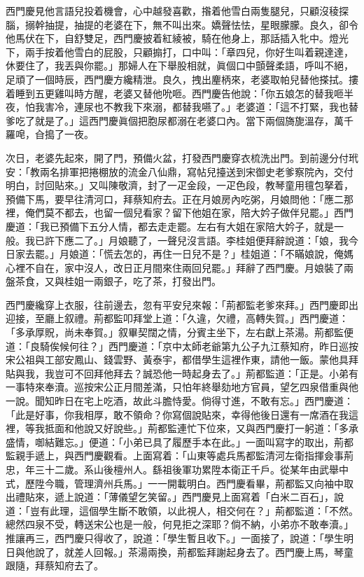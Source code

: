 西門慶見他言語兒投着機會，心中越發喜歡，揝着他雪白兩隻腿兒，{}只顧沒稜探腦，搦幹抽提，抽提的老婆在下，無不叫出來。嬌聲怯怯，星眼朦朦。良久，卻令他馬伏在下，自舒雙足，西門慶披着紅綾被，騎在他身上，那話插入牝中。燈光下，兩手按着他雪白的屁股，只顧搧打，口中叫：「章四兒，你好生叫着親達達，休要住了，我丟與你罷。」那婦人在下舉股相就，{}眞個口中顫聲柔語，呼叫不絕，足頑了一個時辰，西門慶方纔精泄。良久，拽出麈柄來，老婆取帕兒替他搽拭。摟着睡到五更雞叫時方醒，老婆又替他吮咂。西門慶告他說：「你五娘怎的替我咂半夜，怕我害冷，連尿也不教我下來溺，都替我嚥了。」{}老婆道：「這不打緊，我也替爹吃了就是了。」{}這西門慶眞個把胞尿都溺在老婆口內。{}當下兩個旖旎溫存，萬千羅唣，㒲搗了一夜。

次日，老婆先起來，開了門，預備火盆，打發西門慶穿衣梳洗出門。到前邊分付玳安：「教兩名排軍把捲棚放的流金八仙鼎，寫帖兒擡送到宋御史老爹察院內，交付明白，討回貼來。」又叫陳敬濟，封了一疋金段，一疋色段，教琴童用氊包拏着，預備下馬，要早往清河口，拜蔡知府去。正在月娘房內吃粥，月娘問他：「應二那裡，俺們莫不都去，也留一個兒看家？留下他姐在家，陪大妗子做伴兒罷。」西門慶道：「我已預備下五分人情，都去走走罷。左右有大姐在家陪大妗子，就是一般。我已許下應二了。」月娘聽了，一聲兒沒言語。李桂姐便拜辭說道：「娘，我今日家去罷。」月娘道：「慌去怎的，再住一日兒不是？」桂姐道：「不瞞娘說，俺媽心裡不自在，家中沒人，改日正月間來住兩回兒罷。」拜辭了西門慶。月娘裝了兩盤茶食，又與桂姐一兩銀子，吃了茶，打發出門。

西門慶纔穿上衣服，往前邊去，忽有平安兒來報：「荊都監老爹來拜。」西門慶即出迎接，至廳上叙禮。荊都監叩拜堂上道：「久違，欠禮，高轉失賀。」西門慶道：「多承厚貺，尚未奉賀。」叙畢契闊之情，分賓主坐下，左右獻上茶湯。荊都監便道：「良騎俟候何往？」西門慶道：「京中太師老爺第九公子九江蔡知府，昨日巡按宋公祖與工部安鳳山、錢雲野、黃泰宇，都借學生這裡作東，請他一飯。蒙他具拜貼與我，我豈可不回拜他拜去？誠恐他一時起身去了。」{}荊都監道：「正是。小弟有一事特來奉瀆。巡按宋公正月間差滿，只怕年終舉劾地方官員，望乞四泉借重與他一說。聞知昨日在宅上吃酒，故此斗膽恃愛。倘得寸進，不敢有忘。」西門慶道：「此是好事，你我相厚，敢不領命？你寫個說貼來，幸得他後日還有一席酒在我這裡，等我抵面和他說又好說些。」荊都監連忙下位來，又與西門慶打一躬道：「多承盛情，啣結難忘。」便道：「小弟已具了履歷手本在此。」一面叫寫字的取出，荊都監親手遞上，與西門慶觀看。上面寫着：「山東等處兵馬都監清河左衛指揮僉事荊忠，年三十二歲。系山後檀州人。繇祖後軍功累陞本衛正千戶。從某年由武舉中式，歷陞今職，管理濟州兵馬。」一一開載明白。西門慶看畢，荊都監又向袖中取出禮貼來，遞上說道：「薄儀望乞笑留。」{}西門慶見上面寫着「白米二百石」，說道：「豈有此理，這個學生斷不敢領，以此視人，相交何在？」荊都監道：「不然。總然四泉不受，轉送宋公也是一般，何見拒之深耶？倘不納，小弟亦不敢奉瀆。」推讓再三，西門慶只得收了，說道：「學生暫且收下。」一面接了，說道：「學生明日與他說了，就差人回報。」茶湯兩換，荊都監拜謝起身去了。西門慶上馬，琴童跟隨，拜蔡知府去了。

